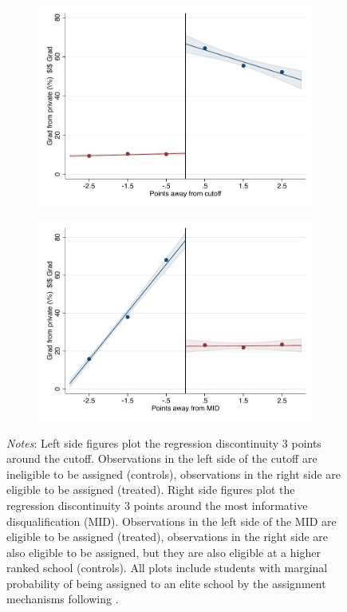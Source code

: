 \documentclass[oneside,11pt]{article}
\begin{document}
\begin{figure}[H]
\begin{center}
    \begin{subfigure}{0.475\textwidth}
        \centering
        \includegraphics[width=\textwidth]{04_Figures/rd_plot_tau_ENLACE_Privado_UNAM3.pdf}
    \end{subfigure}
    \begin{subfigure}{0.475\textwidth}
        \centering
        \includegraphics[width=\textwidth]{04_Figures/rd_plot_mid_ENLACE_Privado_UNAM3.pdf}
    \end{subfigure}
    \end{center}
    
\footnotesize
\textit{Notes}: Left side figures plot the regression discontinuity 3 points around the cutoff. Observations in the left side of the cutoff are ineligible to be assigned (controls), observations in the right side are eligible to be assigned (treated). Right side figures plot the regression discontinuity 3 points around the most informative disqualification (MID). Observations in the left side of the MID are eligible to be assigned (treated), observations in the right side are also eligible to be assigned, but they are also eligible at a higher ranked school (controls). All plots include students with marginal probability of being assigned to an elite school by the assignment mechanisms following \citet{abdulkadirouglu2022breaking}. 
\end{figure}
\end{document}
